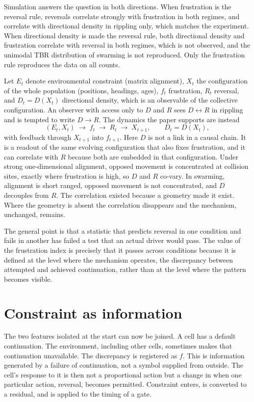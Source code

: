 \documentclass[11pt]{article}
\theoremstyle{definition}
\theoremstyle{remark}
\begin{document}
Simulation answers the question in both directions. When frustration is the reversal rule, reversals correlate strongly with frustration in both regimes, and correlate with directional density in rippling only, which matches the experiment. When directional density is made the reversal rule, both directional density and frustration correlate with reversal in both regimes, which is not observed, and the unimodal TBR distribution of swarming is not reproduced. Only the frustration rule reproduces the data on all counts.

Let $E_t$ denote environmental constraint (matrix alignment), $X_t$ the configuration of the whole population (positions, headings, ages), $f_t$ frustration, $R_t$ reversal, and $D_t=D(X_t)$ directional density, which is an observable of the collective configuration. An observer with access only to $D$ and $R$ sees $D\leftrightarrow R$ in rippling and is tempted to write $D\to R$. The dynamics the paper supports are instead
\[
  (E_t,X_t)\;\to\; f_t \;\to\; R_t \;\to\; X_{t+1},
  \qquad D_t = D(X_t),
\]
with feedback through $X_{t+1}$ into $f_{t+1}$. Here $D$ is not a link in a causal chain. It is a readout of the same evolving configuration that also fixes frustration, and it can correlate with $R$ because both are embedded in that configuration. Under strong one-dimensional alignment, opposed movement is concentrated at collision sites, exactly where frustration is high, so $D$ and $R$ co-vary. In swarming, alignment is short ranged, opposed movement is not concentrated, and $D$ decouples from $R$. The correlation existed because a geometry made it exist. Where the geometry is absent the correlation disappears and the mechanism, unchanged, remains.

The general point is that a statistic that predicts reversal in one condition and fails in another has failed a test that an actual driver would pass. The value of the frustration index is precisely that it passes across conditions because it is defined at the level where the mechanism operates, the discrepancy between attempted and achieved continuation, rather than at the level where the pattern becomes visible.

\section{Constraint as information}

The two features isolated at the start can now be joined. A cell has a default continuation. The environment, including other cells, sometimes makes that continuation unavailable. The discrepancy is registered as $f$. This is information generated by a failure of continuation, not a symbol supplied from outside. The cell's response to it is then not a proportional action but a change in when one particular action, reversal, becomes permitted. Constraint enters, is converted to a residual, and is applied to the timing of a gate.
\end{document}
